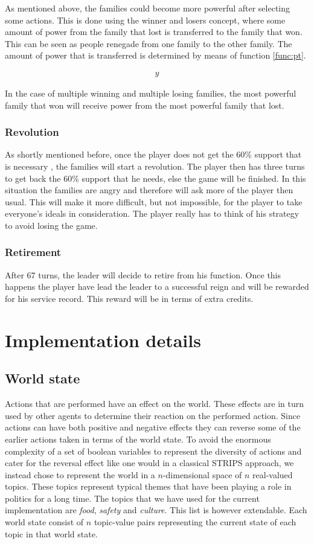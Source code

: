 \documentclass[11pt,a4paper]{article}
\begin{document}
As mentioned above, the families could become more powerful after selecting some actions. This is done using the winner and losers concept, where some amount of power from the  family that lost is transferred to the family that won. This can be seen as people renegade from one family to the other family. The amount of power that is transferred is determined by means of function \ref{func:pt}. 

\begin{align}
y
\label{func:pt}
\end{align}

In the case of multiple winning and multiple losing families, the most powerful family that won will receive power from the most powerful family that lost. 

\subsubsection{Revolution}
As shortly mentioned before, once the player does not get the 60\% support that is necessary , the families will start a revolution. The player then has three turns to get back the 60\% support that he needs, else the game will be finished. In this situation the families are angry and therefore will ask more of the player then usual. This will make it more difficult, but not impossible, for the player to take everyone's ideals in consideration. The player really has to think of his strategy to avoid losing the game.

\subsubsection{Retirement}
After 67 turns, the leader will decide to retire from his function. Once this happens the player have lead the leader to a successful reign and will be rewarded for his service record. This reward will be in terms of extra credits. 


\section{Implementation details}
  \subsection{World state}
    Actions that are performed have an effect on the world. These effects are in turn used by other agents to determine their reaction on the performed action. Since actions can have both positive and negative effects they can reverse some of the earlier actions taken in terms of the world state. To avoid the enormous complexity of a set of boolean variables to represent the diversity of actions and cater for the reversal effect like one would in a classical STRIPS approach, we instead chose to represent the world in a $n$-dimensional space of $n$ real-valued topics. These topics represent typical themes that have been playing a role in politics for a long time. The topics that we have used for the current implementation are \emph{food}, \emph{safety} and \emph{culture}. This list is however extendable. Each world state consist of $n$ topic-value pairs representing the current state of each topic in that world state.
\end{document}
